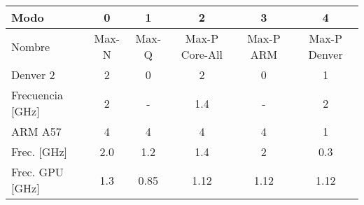 

\begin{table}[]
\centering

\begin{tabular}{lccccc}
\toprule
Modo                     & 0 & 1  & 2     & 3 & 4   \\ \midrule
Nombre                  & Max-N      & Max-Q      & Max-P Core-All & Max-P ARM  & Max-P Denver \\ 
Denver 2                & 2          & 0          & 2              & 0          & 1            \\ 
Frecuencia {[}GHz{]}     & 2          & -          & 1.4            & -          & 2            \\ 
ARM A57                  & 4          & 4          & 4              & 4          & 1            \\ 
Frec. {[}GHz{]}     & 2.0        & 1.2        & 1.4            & 2          & 0.3          \\ 
Frec. GPU {[}GHz{]} & 1.3        & 0.85       & 1.12           & 1.12       & 1.12         \\ 
\bottomrule
\end{tabular}

\end{table}